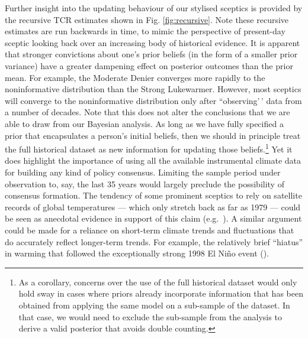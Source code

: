 \documentclass[smallextended]{svjour3}       %
\begin{document}
Further insight into the updating behaviour of our stylised sceptics is
provided by the recursive TCR estimates shown in Fig.
\ref{fig:recursive}. Note these recursive estimates are run backwards in
time, to mimic the perspective of present-day sceptic looking back over
an increasing body of historical evidence. It is apparent that stronger
convictions about one's prior beliefs (in the form of a smaller prior
variance) have a greater dampening effect on posterior outcomes than the
prior mean. For example, the Moderate Denier converges more rapidly to
the noninformative distribution than the Strong Lukewarmer. However,
most sceptics will converge to the noninformative distribution only
after ``observing'\,' data from a number of decades. Note that this does
not alter the conclusions that we are able to draw from our Bayesian
analysis. As long as we have fully specified a prior that encapsulates a
person's initial beliefs, then we should in principle treat the full
historical dataset as new information for updating those
beliefs.\footnote{As a corollary, concerns over the use of the full
  historical dataset would only hold sway in cases where priors already
  incorporate information that has been obtained from applying the same
  model on a sub-sample of the dataset. In that case, we would need to
  exclude the sub-sample from the analysis to derive a valid posterior
  that avoids double counting.} Yet it does highlight the importance of
using all the available instrumental climate data for building any kind
of policy consensus. Limiting the sample period under observation to,
say, the last 35 years would largely preclude the possibility of
consensus formation. The tendency of some prominent sceptics to rely on
satellite records of global temperatures --- which only stretch back as
far as 1979 --- could be seen as anecdotal evidence in support of this
claim (e.g.~\cite{mooney2016cruz}). A similar argument could be made for
a reliance on short-term climate trends and fluctuations that do
accurately reflect longer-term trends. For example, the relatively brief
``hiatus'' in warming that followed the exceptionally strong 1998 El
Niño event (\cite{lewandowsky2016pause}).
\end{document}

